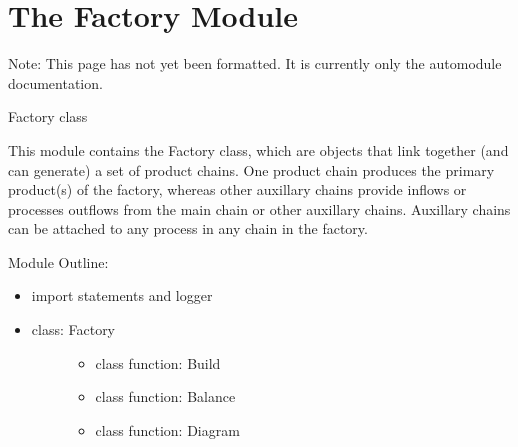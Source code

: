 \documentclass[a4paper,10pt,english]{sphinxmanual}
\begin{document}
\section{The Factory Module}
\label{\detokenize{factory:the-factory-module}}\label{\detokenize{factory::doc}}
Note: This page has not yet been formatted. It is currently only the automodule documentation.

\label{\detokenize{factory:module-factory}}
Factory class

This module contains the Factory class, which are objects that
link together (and can generate) a set of product chains. One product chain
produces the primary product(s) of the factory, whereas other auxillary chains
provide inflows or processes outflows from the main chain or other auxillary
chains. Auxillary chains can be attached to any process in any chain in the
factory.

Module Outline:
\begin{itemize}
\item {} 
import statements and logger

\item {} \begin{description}
\item[{class: Factory}] \leavevmode\begin{itemize}
\item {} 
class function: Build

\item {} 
class function: Balance

\item {} 
class function: Diagram

\end{itemize}

\end{description}

\end{itemize}
\end{document}
